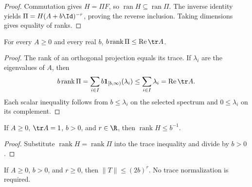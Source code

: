 \begin{proof}
    \leanok
    Commutation gives $H=\Pi F$, so
    $\operatorname{ran}H\subseteq\operatorname{ran}\Pi$.
    The inverse identity yields $\Pi=H(A+b\Id)^{-r}$, proving the reverse
    inclusion. Taking dimensions gives equality of ranks.
\end{proof}

\begin{theorem}
    \label{thm:closed_threshold_rank_trace}
    \leanok
    For every $A\ge0$ and every real $b$,
    $b\operatorname{rank}\Pi\le\operatorname{Re}\tr A$.
\end{theorem}

\begin{proof}
    \leanok
    The rank of an orthogonal projection equals its trace. If
    $\lambda_i$ are the eigenvalues of $A$, then
    \begin{align}
        b\operatorname{rank}\Pi
        =\sum_{i\in I}b\mathbf1_{[b,\infty)}(\lambda_i)
        \le\sum_{i\in I}\lambda_i=\operatorname{Re}\tr A.
    \end{align}
    Each scalar inequality follows from $b\le\lambda_i$ on the selected
    spectrum and $0\le\lambda_i$ on its complement.
\end{proof}

\begin{theorem}
    \label{thm:shifted_density_head_rank}
    \leanok
    If $A\ge0$, $\tr A=1$, $b>0$, and $r\in\R$, then
    $\operatorname{rank}H\le b^{-1}$.
\end{theorem}

\begin{proof}
    \leanok
    Substitute $\operatorname{rank}H=\operatorname{rank}\Pi$ into the
    trace inequality and divide by $b>0$.
\end{proof}

\begin{theorem}
    \label{thm:shifted_power_tail_norm}
    \leanok
    If $A\ge0$, $b>0$, and $r\ge0$, then $\|T\|\le(2b)^r$.
    No trace normalization is required.
\end{theorem}

